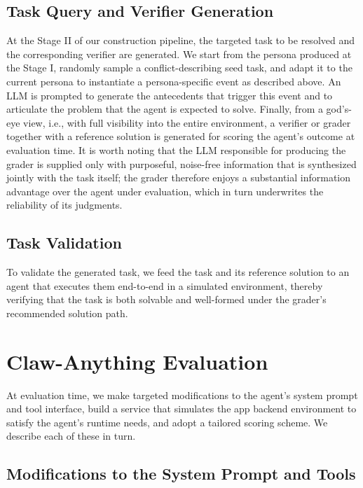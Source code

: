 \documentclass{article}
\begin{document}
\subsection{Task Query and Verifier Generation}

At the Stage II of our construction pipeline, the targeted task to be resolved and the corresponding verifier are generated. We start from the persona produced at the Stage I, randomly sample a conflict-describing seed task, and adapt it to the current persona to instantiate a persona-specific event as described above. An LLM is prompted to generate the antecedents that trigger this event and to articulate the problem that the agent is expected to solve. Finally, from a god's-eye view, i.e., with full visibility into the entire environment, a verifier or grader together with a reference solution is generated for scoring the agent's outcome at evaluation time. It is worth noting that the LLM responsible for producing the grader is supplied only with purposeful, noise-free information that is synthesized jointly with the task itself; the grader therefore enjoys a substantial information advantage over the agent under evaluation, which in turn underwrites the reliability of its judgments. 

\subsection{Task Validation}

To validate the generated task, we feed the task and its reference solution to an agent that executes them end-to-end in a simulated environment, thereby verifying that the task is both solvable and well-formed under the grader's recommended solution path.

\section{Claw-Anything Evaluation}

At evaluation time, we make targeted modifications to the agent's system prompt and tool interface, build a service that simulates the app backend environment to satisfy the agent's runtime needs, and adopt a tailored scoring scheme. We describe each of these in turn.

\subsection{Modifications to the System Prompt and Tools}
\end{document}
